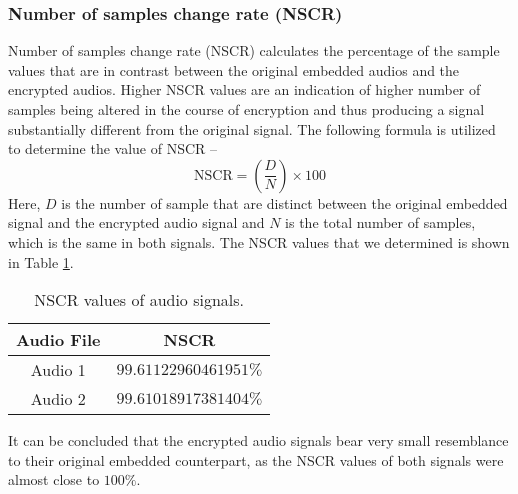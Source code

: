 \documentclass{article}
\begin{document}
\subsubsection{Number of samples change rate (NSCR)}
Number of samples change rate (NSCR) calculates the percentage of the sample values that are in contrast between the original embedded audios and the encrypted audios. Higher NSCR values are an indication of higher number of samples being altered in the course of encryption and thus producing a signal substantially different from the original signal. The following formula is utilized to determine the value of NSCR --
\begin{equation}
    \text{NSCR}=\left(\frac{D}{N}\right)\times100
\end{equation}
Here, $D$ is the number of sample that are distinct between the original embedded signal and the encrypted audio signal and $N$ is the total number of samples, which is the same in both signals. The NSCR values that we determined is shown in Table \ref{table:nscr}.
\begin{table}[!h]
    \begin{center}
        \caption{NSCR values of audio signals.}
        \begin{tabular}{cc}
            \hline
            Audio File & NSCR                  \\ \hline
            Audio 1    & $99.61122960461951\%$ \\ \hdashline
            Audio 2    & $99.61018917381404\%$ \\ \hline
        \end{tabular}
        \label{table:nscr}
    \end{center}
\end{table}

It can be concluded that the encrypted audio signals bear very small resemblance to their original embedded counterpart, as the NSCR values of both signals were almost close to $100\%$.
\end{document}
